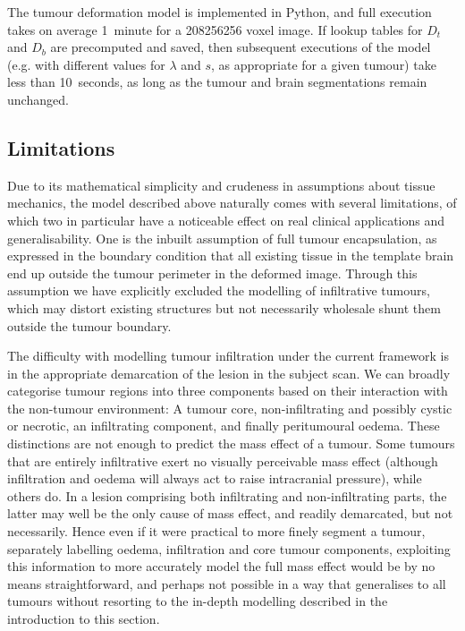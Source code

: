 The tumour deformation model is implemented in Python, and full execution takes on average 1~minute for a 208\x{}256\x{}256 voxel image.
If lookup tables for $ D_t$ and $D_b$ are precomputed and saved, then subsequent executions of the model (e.g. with different values for $\lambda$ and $s$, as appropriate for a given tumour) take less than 10~seconds, as long as the tumour and brain segmentations remain unchanged.

\subsection{Limitations}

Due to its mathematical simplicity and crudeness in assumptions about tissue mechanics, the model described above naturally comes with several limitations, of which two in particular have a noticeable effect on real clinical applications and generalisability.
One is the inbuilt assumption of full tumour encapsulation, as expressed in the boundary condition that all existing tissue in the template brain end up outside the tumour perimeter in the deformed image.
Through this assumption we have explicitly excluded the modelling of infiltrative tumours, which may distort existing structures but not necessarily wholesale shunt them outside the tumour boundary.

The difficulty with modelling tumour infiltration under the current framework is in the appropriate demarcation of the lesion in the subject scan.
We can broadly categorise tumour regions into three components based on their interaction with the non-tumour environment:
A tumour core, non-infiltrating and possibly cystic or necrotic, an infiltrating component, and finally peritumoural oedema.
These distinctions are not enough to predict the mass effect of a tumour.
Some tumours that are entirely infiltrative exert no visually perceivable mass effect (although infiltration and oedema will always act to raise intracranial pressure), while others do.
In a lesion comprising both infiltrating and non-infiltrating parts, the latter may well be the only cause of mass effect, and readily demarcated, but not necessarily.
Hence even if it were practical to more finely segment a tumour, separately labelling oedema, infiltration and core tumour components, exploiting this information to more accurately model the full mass effect would be by no means straightforward, and perhaps not possible in a way that generalises to all tumours without resorting to the in-depth modelling described in the introduction to this section.

